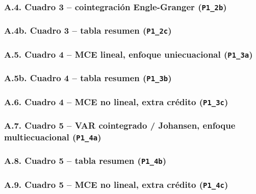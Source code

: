 \documentclass[12pt, letterpaper]{article}
\begin{document}
\subsubsection*{A.4. Cuadro 3 -- cointegración Engle-Granger
                    (\texttt{P1\_2b})}


\subsubsection*{A.4b. Cuadro 3 -- tabla resumen (\texttt{P1\_2c})}


\subsubsection*{A.5. Cuadro 4 -- MCE lineal, enfoque uniecuacional
                    (\texttt{P1\_3a})}


\subsubsection*{A.5b. Cuadro 4 -- tabla resumen (\texttt{P1\_3b})}


\subsubsection*{A.6. Cuadro 4 -- MCE no lineal, extra crédito
                    (\texttt{P1\_3c})}


\subsubsection*{A.7. Cuadro 5 -- VAR cointegrado / Johansen, enfoque
                    multiecuacional (\texttt{P1\_4a})}


\subsubsection*{A.8. Cuadro 5 -- tabla resumen (\texttt{P1\_4b})}


\subsubsection*{A.9. Cuadro 5 -- MCE no lineal, extra crédito
                    (\texttt{P1\_4c})}

\end{document}
